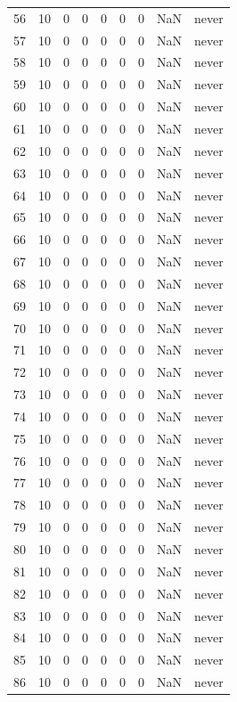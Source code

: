 \begin{longtable}{rrrrrrrrl}
56 & 10 & 0 & 0 & 0 & 0 & 0 & NaN & never \\
57 & 10 & 0 & 0 & 0 & 0 & 0 & NaN & never \\
58 & 10 & 0 & 0 & 0 & 0 & 0 & NaN & never \\
59 & 10 & 0 & 0 & 0 & 0 & 0 & NaN & never \\
60 & 10 & 0 & 0 & 0 & 0 & 0 & NaN & never \\
61 & 10 & 0 & 0 & 0 & 0 & 0 & NaN & never \\
62 & 10 & 0 & 0 & 0 & 0 & 0 & NaN & never \\
63 & 10 & 0 & 0 & 0 & 0 & 0 & NaN & never \\
64 & 10 & 0 & 0 & 0 & 0 & 0 & NaN & never \\
65 & 10 & 0 & 0 & 0 & 0 & 0 & NaN & never \\
66 & 10 & 0 & 0 & 0 & 0 & 0 & NaN & never \\
67 & 10 & 0 & 0 & 0 & 0 & 0 & NaN & never \\
68 & 10 & 0 & 0 & 0 & 0 & 0 & NaN & never \\
69 & 10 & 0 & 0 & 0 & 0 & 0 & NaN & never \\
70 & 10 & 0 & 0 & 0 & 0 & 0 & NaN & never \\
71 & 10 & 0 & 0 & 0 & 0 & 0 & NaN & never \\
72 & 10 & 0 & 0 & 0 & 0 & 0 & NaN & never \\
73 & 10 & 0 & 0 & 0 & 0 & 0 & NaN & never \\
74 & 10 & 0 & 0 & 0 & 0 & 0 & NaN & never \\
75 & 10 & 0 & 0 & 0 & 0 & 0 & NaN & never \\
76 & 10 & 0 & 0 & 0 & 0 & 0 & NaN & never \\
77 & 10 & 0 & 0 & 0 & 0 & 0 & NaN & never \\
78 & 10 & 0 & 0 & 0 & 0 & 0 & NaN & never \\
79 & 10 & 0 & 0 & 0 & 0 & 0 & NaN & never \\
80 & 10 & 0 & 0 & 0 & 0 & 0 & NaN & never \\
81 & 10 & 0 & 0 & 0 & 0 & 0 & NaN & never \\
82 & 10 & 0 & 0 & 0 & 0 & 0 & NaN & never \\
83 & 10 & 0 & 0 & 0 & 0 & 0 & NaN & never \\
84 & 10 & 0 & 0 & 0 & 0 & 0 & NaN & never \\
85 & 10 & 0 & 0 & 0 & 0 & 0 & NaN & never \\
86 & 10 & 0 & 0 & 0 & 0 & 0 & NaN & never \\

\end{longtable}
